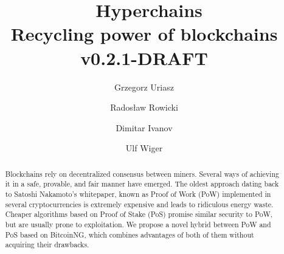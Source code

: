 \documentclass{article}
\title{\huge \Aet\ Hyperchains \\[0.5em]
  \large Recycling power of blockchains
  \\[1em] v0.2.1-DRAFT }
\author{ Grzegorz Uriasz
  \and Radosław Rowicki
  \and Dimitar Ivanov
  \and Ulf Wiger
}
\begin{document}
\maketitle

\begin{abstract}
  Blockchains rely on decentralized consensus between miners. Several ways of
  achieving it in a safe, provable, and fair manner have emerged. The oldest
  approach dating back to Satoshi Nakamoto's whitepaper, known as Proof of Work
  (PoW) implemented in several cryptocurrencies is extremely expensive and
  leads to ridiculous energy waste. Cheaper algorithms based on Proof of Stake (PoS)
  promise similar security to PoW, but are usually prone to exploitation. We
  propose a novel hybrid between PoW and PoS based on BitcoinNG, which combines
  advantages of both of them without acquiring their drawbacks.
\end{abstract}

\tableofcontents

\newpage









 
\end{document}

